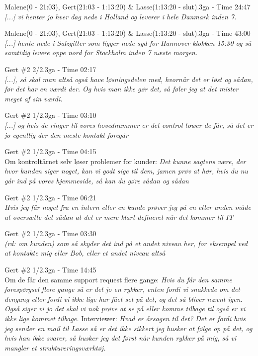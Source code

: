 \begin{thebibliography}{9}

	Malene(0 - 21:03), Gert(21:03 - 1:13:20) \& Lasse(1:13:20 - slut).3ga - Time 24:47\\
	\textit{[...] vi henter jo hver dag nede i Holland og leverer i hele Danmark inden 7.}

	Malene(0 - 21:03), Gert(21:03 - 1:13:20) \& Lasse(1:13:20 - slut).3ga - Time 43:00\\
	\textit{[...] hente nede i Salzgitter som ligger nede syd for Hannover klokken 15:30 og så samtidig levere oppe nord for Stockholm inden 7 næste morgen.}

	Gert \#2 2/2.3ga - Time 02:17\\
	\textit{[...], så skal man altså også have løsningsdelen med, hvornår det er løst og sådan, før det har en værdi der. Og hvis man ikke gør det, så føler jeg at det mister meget af sin værdi.}

	Gert \#2 1/2.3ga - Time 03:10\\
	\textit{[...] og hvis de ringer til vores hovednummer er det control tower de får, så det er jo egentlig der den meste kontakt foregår}

	Gert \#2 1/2.3ga - Time 04:15\\
	Om kontroltårnet selv løser problemer for kunder: \textit{Det kunne sagtens være, der hvor kunden siger noget, kan vi godt sige til dem, jamen prøv at hør, hvis du nu går ind på vores hjemmeside, så kan du gøre sådan og sådan}

	Gert \#2 1/2.3ga - Time 06:21\\
	\textit{Hvis jeg får noget fra en intern eller en kunde prøver jeg på en eller anden måde at oversætte det sådan at det er mere klart defineret når det kommer til IT}

	Gert \#2 1/2.3ga - Time 03:30\\
	\textit{\emph{(rd: om kunden)} som så skyder det ind på et andet niveau her, for eksempel ved at kontakte mig eller Bob, eller et andet niveau altså}

	Gert \#2 1/2.3ga - Time 14:45\\
	Om de får den samme support request flere gange: \textit{Hvis du får den samme forespørgsel flere gange så er det jo en rykker, enten fordi vi snakkede om det dengang eller fordi vi ikke lige har fået set på det, og det så bliver nævnt igen. Også siger vi jo det skal vi nok prøve at se på eller komme tilbage til også er vi ikke lige kommet tilbage.} Interviewer: \textit{Hvad er årsagen til det?} \textit{Det er fordi hvis jeg sender en mail til Lasse så er det ikke sikkert jeg husker at følge op på det, og hvis han ikke svarer, så husker jeg det først når kunden rykker på mig, så vi mangler et struktureringsværktøj. }


\end{thebibliography}
